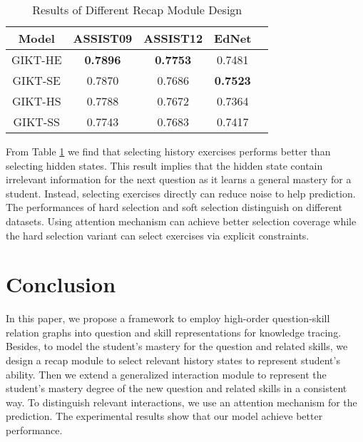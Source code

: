 \documentclass[runningheads]{llncs}
\begin{document}
\begin{table}
	\centering
	\caption{Results of Different Recap Module Design}
\begin{tabular}{ccccc}
		\hline
		Model & ASSIST09 & ASSIST12 & EdNet \\
		\hline
		
GIKT-HE & \textbf{0.7896} & \textbf{0.7753} & 0.7481  \\
		GIKT-SE & 0.7870 & 0.7686 &  \textbf{0.7523}  \\
		GIKT-HS & 0.7788 & 0.7672 & 0.7364\\
		GIKT-SS & 0.7743 & 0.7683 & 0.7417  \\
		\hline
		\hline
	\end{tabular}
	\label{tab:interaction}
\end{table}

From Table \ref{tab:interaction} we find that selecting history exercises performs better than selecting hidden states. This result implies that the hidden state contain irrelevant information for the next question as it learns a general mastery for a student. Instead, selecting exercises directly can reduce noise to help prediction. The performances of hard selection and soft selection distinguish on different datasets. Using attention mechanism can achieve better selection coverage while the hard selection variant can select exercises via explicit constraints.




























\section{Conclusion}
In this paper, we propose a framework to employ high-order question-skill relation graphs into question and skill representations for knowledge tracing. Besides, to model the student's mastery for the question and related skills, we design a recap module to select relevant history states to represent student's ability. Then we extend a generalized interaction module to represent the student's mastery degree of the new question and related skills in a consistent way. To distinguish relevant interactions, we use an attention mechanism for the prediction. The experimental results show that our model achieve better performance.
\end{document}
